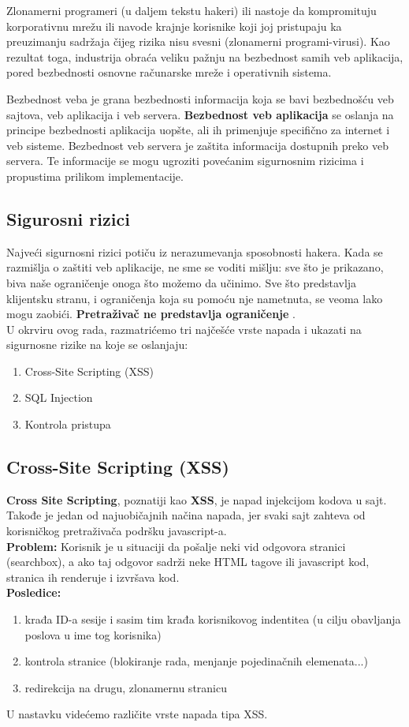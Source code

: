 \documentclass[a4paper]{article}
\begin{document}
Zlonamerni programeri (u daljem tekstu hakeri) ili nastoje da kompromituju korporativnu mrežu ili navode krajnje korisnike koji joj pristupaju ka preuzimanju sadržaja čijeg rizika nisu svesni (zlonamerni programi-virusi). Kao rezultat toga, industrija obraća veliku pažnju na bezbednost samih veb aplikacija, pored bezbednosti osnovne računarske mreže i operativnih sistema.

Bezbednost veba je grana bezbednosti informacija koja se bavi bezbednošću veb sajtova, veb aplikacija i veb servera. \textbf{Bezbednost veb aplikacija} se oslanja na principe bezbednosti aplikacija uopšte, ali ih primenjuje specifično za internet i veb sisteme.
Bezbednost veb servera je zaštita informacija dostupnih preko veb servera. Te informacije se mogu ugroziti povećanim sigurnosnim rizicima i propustima prilikom implementacije.

\subsection{Sigurosni rizici}

Najveći sigurnosni rizici potiču iz nerazumevanja sposobnosti hakera. Kada se razmišlja o zaštiti veb aplikacije, ne sme se voditi mišlju: sve što je prikazano, biva naše ograničenje onoga što možemo da učinimo. Sve što predstavlja klijentsku stranu, i ograničenja koja su pomoću nje nametnuta, se veoma lako mogu zaobići.
\textbf{Pretraživač ne predstavlja ograničenje }.\\
U okrviru ovog rada, razmatrićemo tri najčešće vrste napada i ukazati na sigurnosne rizike na koje se oslanjaju:
\begin{enumerate}
	\item Cross-Site Scripting (XSS)
	\item SQL Injection
	\item Kontrola pristupa
\end{enumerate}
\newpage
\subsection{Cross-Site Scripting (XSS)}
\textbf{Cross Site Scripting}, poznatiji kao \textbf{XSS}, je napad injekcijom kodova u sajt. Takođe je jedan od najuobičajnih načina napada, jer svaki sajt zahteva od korisničkog pretraživača podršku javascript-a.\\
\textbf{Problem:} Korisnik je u situaciji da pošalje neki vid odgovora stranici (searchbox), a ako taj odgovor sadrži neke HTML tagove ili javascript kod, stranica ih renderuje i izvršava kod.\\
\textbf{Posledice:}
\begin{enumerate}
	\item krađa ID-a sesije i sasim tim krađa korisnikovog indentitea (u cilju obavljanja poslova u ime tog korisnika)
	\item kontrola stranice (blokiranje rada, menjanje pojedinačnih elemenata...)
	\item redirekcija na drugu, zlonamernu stranicu
\end{enumerate}
U nastavku videćemo različite vrste napada tipa XSS.
\end{document}
